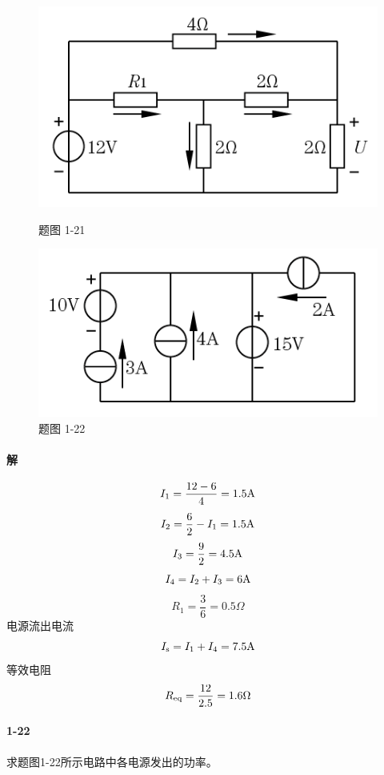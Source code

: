 \documentclass[hyperref, UTF8]{ctexart}
\begin{document}
\begin{figure}[!htb]
  \centering
  \begin{minipage}[t]{0.305\textwidth}
    \centering
    \includegraphics[width=1\textwidth]{p1-21.png}
    \caption*{题图 1-21}
  \end{minipage}
  \begin{minipage}[t]{0.296\textwidth}
    \centering
    \includegraphics[width=1\textwidth]{p1-22.png}
    \caption*{题图 1-22}
  \end{minipage}
\end{figure}

\paragraph{解}
$$I_1=\frac{12-6}{4}=1.5{\rm A}$$
$$I_2=\frac{6}{2}-I_1=1.5{\rm A}$$
$$I_3=\frac{9}{2}=4.5{\rm A}$$
$$I_4=I_2+I_3=6{\rm A}$$
$$R_1=\frac{3}{6}=0.5\Omega$$
电源流出电流$$I_{\rm s}=I_1+I_4=7.5{\rm A}$$
等效电阻$$R_{\rm eq}=\frac{12}{2.5}=1.6\Omega$$

\paragraph{1-22}\label{1-22}
求题图1-22所示电路中各电源发出的功率。
\end{document}
